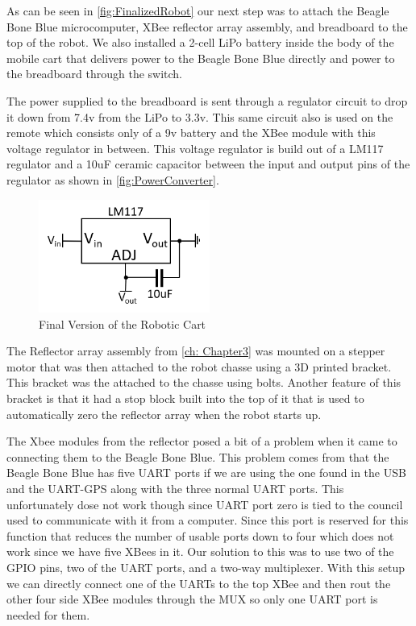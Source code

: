 As can be seen in \autoref{fig:FinalizedRobot} our next step was to attach the Beagle Bone Blue microcomputer, XBee reflector array assembly, and breadboard to the top of the robot.  We also installed a 2-cell LiPo battery inside the body of the mobile cart that delivers power to the Beagle Bone Blue directly and power to the breadboard through the switch. \par
The power supplied to the breadboard is sent through a regulator circuit to drop it down from 7.4v from the LiPo to 3.3v.  This same circuit also is used on the remote which consists only of a 9v battery and the XBee module with this voltage regulator in between.  This voltage regulator is build out of a LM117 regulator and a 10uF ceramic capacitor between the input and output pins of the regulator as shown in \autoref{fig:PowerConverter}.

\begin{figure}
	\centering
	\includegraphics[width=0.5\textwidth]{figs/img/PowerConverter.png}
	\caption{Final Version of the Robotic Cart}
 	\label{fig:PowerConverter}
\end{figure}

The Reflector array assembly from \autoref{ch: Chapter3} was mounted on a stepper motor that was then attached to the robot chasse using a 3D printed bracket.  This bracket was the attached to the chasse using bolts.  Another feature of this bracket is that it had a stop block built into the top of it that is used to automatically zero the reflector array when the robot starts up.\par
The Xbee modules from the reflector posed a bit of a problem when it came to connecting them to the Beagle Bone Blue.  This problem comes from that the Beagle Bone Blue has five UART ports if we are using the one found in the USB and the UART-GPS along with the three normal UART ports.  This unfortunately dose not work though since UART port zero is tied to the council used to communicate with it from a computer.  Since this port is reserved for this function that reduces the number of usable ports down to four which does not work since we have five XBees in it.  Our solution to this was to use two of the GPIO pins, two of the UART ports, and a two-way multiplexer.  With this setup we can directly connect one of the UARTs to the top XBee and then rout the other four side XBee modules through the MUX so only one UART port is needed for them.


